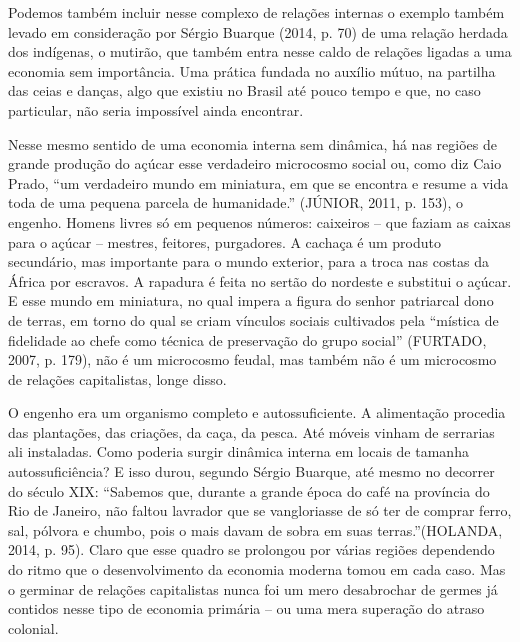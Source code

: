 Podemos também incluir nesse complexo de relações internas o exemplo
também levado em consideração por Sérgio Buarque (2014, p. 70) de uma
relação herdada dos indígenas, o mutirão, que também entra nesse caldo
de relações ligadas a uma economia sem importância. Uma prática fundada
no auxílio mútuo, na partilha das ceias e danças, algo que existiu no
Brasil até pouco tempo e que, no caso particular, não seria impossível
ainda encontrar.

Nesse mesmo sentido de uma economia interna sem dinâmica, há nas regiões
de grande produção do açúcar esse verdadeiro microcosmo social ou, como
diz Caio Prado, ``um verdadeiro mundo em miniatura, em que se encontra e
resume a vida toda de uma pequena parcela de humanidade.'' (JÚNIOR,
2011, p. 153), o engenho. Homens livres só em pequenos números:
caixeiros -- que faziam as caixas para o açúcar -- mestres, feitores,
purgadores. A cachaça é um produto secundário, mas importante para o
mundo exterior, para a troca nas costas da África por escravos. A
rapadura é feita no sertão do nordeste e substitui o açúcar. E esse
mundo em miniatura, no qual impera a figura do senhor patriarcal dono de
terras, em torno do qual se criam vínculos sociais cultivados pela
``mística de fidelidade ao chefe como técnica de preservação do grupo
social'' (FURTADO, 2007, p. 179), não é um microcosmo feudal, mas também
não é um microcosmo de relações capitalistas, longe disso.

O engenho era um organismo completo e autossuficiente. A alimentação
procedia das plantações, das criações, da caça, da pesca. Até móveis
vinham de serrarias ali instaladas. Como poderia surgir dinâmica interna
em locais de tamanha autossuficiência? E isso durou, segundo Sérgio
Buarque, até mesmo no decorrer do século XIX: ``Sabemos que, durante a
grande época do café na província do Rio de Janeiro, não faltou lavrador
que se vangloriasse de só ter de comprar ferro, sal, pólvora e chumbo,
pois o mais davam de sobra em suas terras.''(HOLANDA, 2014, p. 95).
Claro que esse quadro se prolongou por várias regiões dependendo do
ritmo que o desenvolvimento da economia moderna tomou em cada caso. Mas
o germinar de relações capitalistas nunca foi um mero desabrochar de
germes já contidos nesse tipo de economia primária -- ou uma mera
superação do atraso colonial.

